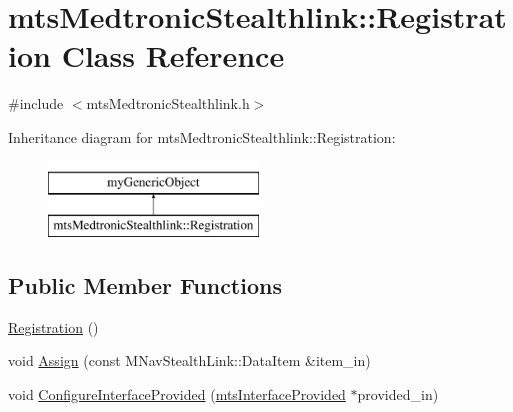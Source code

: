 \hypertarget{classmts_medtronic_stealthlink_1_1_registration}{\section{mts\-Medtronic\-Stealthlink\-:\-:Registration Class Reference}
\label{classmts_medtronic_stealthlink_1_1_registration}
}


{\ttfamily \#include $<$mts\-Medtronic\-Stealthlink.\-h$>$}

Inheritance diagram for mts\-Medtronic\-Stealthlink\-:\-:Registration\-:\begin{figure}[H]
\begin{center}
\leavevmode
\includegraphics[height=2.000000cm]{d9/d2e/classmts_medtronic_stealthlink_1_1_registration}
\end{center}
\end{figure}
\subsection*{Public Member Functions}
\begin{DoxyCompactItemize}
\item 
\hyperlink{classmts_medtronic_stealthlink_1_1_registration_a8cf212c78930089706b7c7ab4de22250}{Registration} ()
\item 
void \hyperlink{classmts_medtronic_stealthlink_1_1_registration_aefbb9a745491a4306cdb9c156b7431d2}{Assign} (const M\-Nav\-Stealth\-Link\-::\-Data\-Item \&item\-\_\-in)
\item 
void \hyperlink{classmts_medtronic_stealthlink_1_1_registration_abbb8b70200e944f86a05ec85eba2428b}{Configure\-Interface\-Provided} (\hyperlink{classmts_interface_provided}{mts\-Interface\-Provided} $\ast$provided\-\_\-in)
\end{DoxyCompactItemize}
